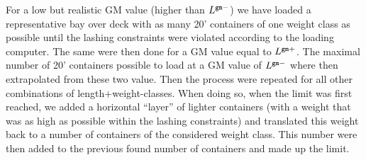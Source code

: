 For a low but realistic GM value (higher than $L^{\texttt{gm}-}$) we have loaded a representative bay over deck with as many 20' containers of one weight class as possible until the lashing constraints were violated according to the loading computer. The same were then done for a GM value equal to $L^{\texttt{gm}+}$. The maximal number of 20' containers possible to load at a GM value of $L^{\texttt{gm}-}$ where then extrapolated from these two value. 
Then the process were repeated for all other combinations of length+weight-classes.
When doing so, when the limit was first reached, we added a horizontal ``layer'' of lighter containers (with a weight that was as high as possible within the lashing constraints) and translated this weight back to a number of containers of the considered weight class. This number were then added to the previous found number of containers and made up the limit.


